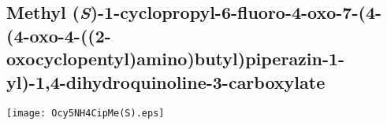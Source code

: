 %
%

%
%
%
\subsection{Methyl (\textit{S})\hyp{}1\hyp{}cyclopropyl\hyp{}6\hyp{}fluoro\hyp{}4\hyp{}oxo\hyp{}7\hyp{}(4\hyp{}(4\hyp{}oxo\hyp{}4\hyp{}((2\hyp{}oxocyclopentyl)amin\allowbreak o)butyl)piperazin\hyp{}1\hyp{}yl)\hyp{}1,4\hyp{}dihydroquinoline\hyp{}3\hyp{}carboxylate }


\begin{scheme}[H]
	\begin{center}
		\texttt{[image: Ocy5NH4CipMe(S).eps]}
	\end{center}
\end{scheme}

